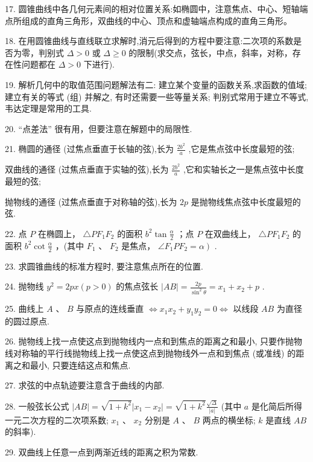 17. 圆锥曲线中各几何元素间的相对位置关系:如椭圆中，注意焦点、中心、短轴端点所组成的直角三角形，双曲线的中心、顶点和虚轴端点构成的直角三角形。

18. 在用圆锥曲线与直线联立求解时,消元后得到的方程中要注意:二次项的系数是否为零，判别式 $\Delta  > 0$ 或 $\Delta  \geq  0$ 的限制(求交点，弦长，中点，斜率，对称，存在性问题都在 $\Delta  > 0$ 下进行).

19. 解析几何中的取值范围问题解法有二:   建立某个变量的函数关系,求函数的值域;   建立有关的等式 (组) 并解之, 有时还需要一些等量关系; 判别式常用于建立不等式, 韦达定理是常用的工具.

20. “点差法” 很有用，但要注意在解题中的局限性.

21. 椭圆的通径 (过焦点垂直于长轴的弦),长为 $\frac{2{b}^{2}}{a}$ ,它是焦点弦中长度最短的弦;

双曲线的通径 (过焦点垂直于实轴的弦),长为 $\frac{2{b}^{2}}{a}$ ,它和实轴长之一是焦点弦中长度最短的弦;

抛物线的通径 (过焦点垂直于对称轴的弦),长为 ${2p}$ 是抛物线焦点弦中长度最短的弦.

22. 点 $P$ 在椭圆上， $\bigtriangleup  P{F}_{1}{F}_{2}$ 的面积 ${b}^{2}\tan \frac{\alpha }{2}$ ；点 $P$ 在双曲线上， $\bigtriangleup  P{F}_{1}{F}_{2}$ 的面积 ${b}^{2}\cot \frac{\alpha }{2}$ ，(其中 ${F}_{1}$ 、 ${F}_{2}$ 是焦点， $\left. {\angle {F}_{1}P{F}_{2} = \alpha }\right)$ .

23. 求圆锥曲线的标准方程时, 要注意焦点所在的位置.

24. 抛物线 ${y}^{2} = {2px}\left( {p > 0}\right)$ 的焦点弦长 $\left| {AB}\right|  = \frac{2p}{{\sin }^{2}\theta } = {x}_{1} + {x}_{2} + p$ .

25. 曲线上 $A\text{ 、 }B$ 与原点的连线垂直 $\Leftrightarrow  {x}_{1}{x}_{2} + {y}_{1}{y}_{2} = 0 \Leftrightarrow$ 以线段 ${AB}$ 为直径的圆过原点.

26. 抛物线上找一点使这点到抛物线内一点和到焦点的距离之和最小, 只要作抛物线对称轴的平行线抛物线上找一点使这点到抛物线外一点和到焦点 (或准线) 的距离之和最小, 只要连结这点和焦点.

27. 求弦的中点轨迹要注意含于曲线的内部.

28. 一般弦长公式 $\left| {AB}\right|  = \sqrt{1 + {k}^{2}}\left| {{x}_{1} - {x}_{2}}\right|  = \sqrt{1 + {k}^{2}}\frac{\sqrt{\Delta }}{\left| a\right| }$ (其中 $a$ 是化简后所得一元二次方程的二次项系数; ${x}_{1}\text{ 、 }{x}_{2}$ 分别是 $A\text{ 、 }B$ 两点的横坐标; $k$ 是直线 ${AB}$ 的斜率).

29. 双曲线上任意一点到两渐近线的距离之积为常数.

